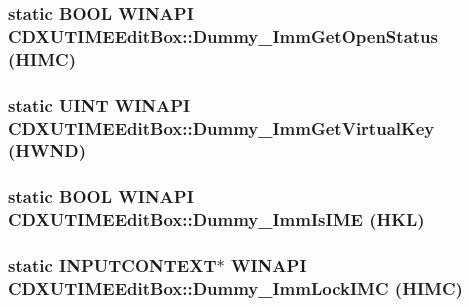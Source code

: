 \label{class_c_d_x_u_t_i_m_e_edit_box_a2741f033ba2d986072d42e06cfe6964e}
\hypertarget{class_c_d_x_u_t_i_m_e_edit_box_aa765987d0faac289568999c30cfa318f}{
\subsubsection[{Dummy\_\-ImmGetOpenStatus}]{\setlength{\rightskip}{0pt plus 5cm}static {\bf BOOL} WINAPI CDXUTIMEEditBox::Dummy\_\-ImmGetOpenStatus ({\bf HIMC})}}
\label{class_c_d_x_u_t_i_m_e_edit_box_aa765987d0faac289568999c30cfa318f}
\hypertarget{class_c_d_x_u_t_i_m_e_edit_box_a27d9701b01e3dd2f619bfed972a20c84}{
\subsubsection[{Dummy\_\-ImmGetVirtualKey}]{\setlength{\rightskip}{0pt plus 5cm}static {\bf UINT} WINAPI CDXUTIMEEditBox::Dummy\_\-ImmGetVirtualKey (HWND)}}
\label{class_c_d_x_u_t_i_m_e_edit_box_a27d9701b01e3dd2f619bfed972a20c84}
\hypertarget{class_c_d_x_u_t_i_m_e_edit_box_a0429a5b7c90ab227fc79d0e82f61db9d}{
\subsubsection[{Dummy\_\-ImmIsIME}]{\setlength{\rightskip}{0pt plus 5cm}static {\bf BOOL} WINAPI CDXUTIMEEditBox::Dummy\_\-ImmIsIME (HKL)}}
\label{class_c_d_x_u_t_i_m_e_edit_box_a0429a5b7c90ab227fc79d0e82f61db9d}
\hypertarget{class_c_d_x_u_t_i_m_e_edit_box_a0251f6c7891e81c331f93217805ef9c0}{
\subsubsection[{Dummy\_\-ImmLockIMC}]{\setlength{\rightskip}{0pt plus 5cm}static INPUTCONTEXT$\ast$ WINAPI CDXUTIMEEditBox::Dummy\_\-ImmLockIMC ({\bf HIMC})}}
